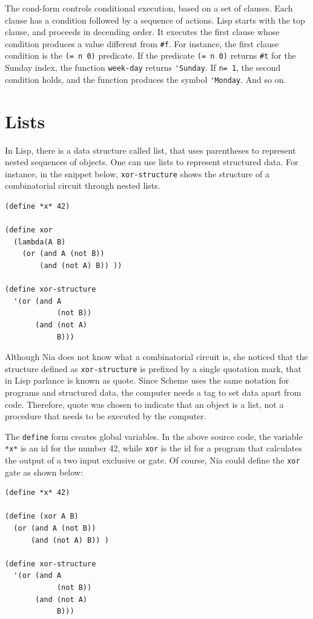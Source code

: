 \documentclass[a4paper,12pt]{book}
\begin{document}
The cond-form controls conditional
execution, based on a set of clauses.
Each clause has a condition followed by
a sequence of actions.  Lisp starts with the
top clause, and proceeds in decending order.
It executes the first clause whose 
condition produces a value different from \verb|#f|.
For instance, the first clause condition is
the \verb|(= n 0)| predicate.
If the predicate \verb|(= n 0)| 
returns \verb|#t| for the Sunday index,
the function \verb|week-day| returns \verb|'Sunday|.
If \verb|n= 1|, the second condition holds,
and the function produces the symbol \verb|'Monday|.
And so on.


\section{Lists}
In Lisp, there is a data structure called list,
that uses parentheses to represent nested
sequences of objects. One can use lists to
represent structured data.
For instance, in the snippet below,
\verb|xor-structure| shows
the structure of a combinatorial circuit
through nested lists.

\begin{verbatim}
(define *x* 42)

(define xor
  (lambda(A B)
    (or (and A (not B))
        (and (not A) B)) ))

(define xor-structure
  '(or (and A  
            (not B))
       (and (not A) 
            B)))
\end{verbatim}

Although Nia does not know what a combinatorial 
circuit is, she noticed that the structure
defined as \verb|xor-structure| is prefixed by a
single quotation mark, that in Lisp parlance is
known as quote. Since Scheme uses the
same notation for programs and structured
data, the computer needs a tag to set
data apart from code. Therefore, 
quote was chosen to indicate that
an object is a list, not a procedure that
needs to be executed by the computer.

The \verb|define| form creates global
variables. In the above source code,
the variable \verb|*x*| is an id for the
number 42,
while \verb|xor| is the id for a program
that calculates the output of a two
input exclusive or gate. Of course, Nia
could define the \verb|xor| gate as shown below:
\begin{verbatim}
(define *x* 42)

(define (xor A B)
  (or (and A (not B))
      (and (not A) B)) )

(define xor-structure
  '(or (and A 
            (not B))
       (and (not A) 
            B)))
\end{verbatim}
\end{document}

